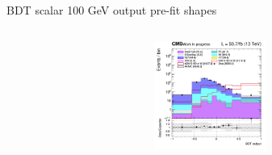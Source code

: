 \documentclass[8pt]{beamer}
\begin{document}
\begin{frame}{BDT scalar 100 GeV output pre-fit shapes}
\begin{columns}
\begin{column}{0.33\textwidth}
\begin{center}
			\begin{block}{}\end{block}	
     			\includegraphics[width=1.0\textwidth, height=100pt]{figs/2018/SmearSR-ttDM-scalar100/log_cratio_ST_topCR_ll_BDT_ttDM100_ST_BDT_output_scalar100_customBinsAttempt7.png}
    		\end{center}		
		\end{column}
\end{columns}


\end{frame}
\end{document}
